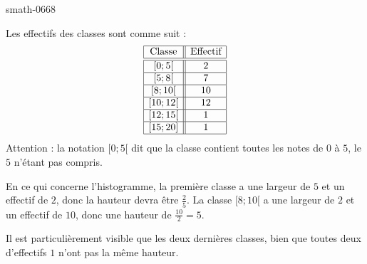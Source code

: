 
\begin{corrige}{smath-0668}

\begin{wrapfigure}{r}{12.cm}
   \vspace{-0.5cm}        %
   \centering
   
\end{wrapfigure}


    Les effectifs des classes sont comme suit :
    \begin{equation*}
        \begin{array}[]{|c||c|}
            \hline
            \text{Classe}&\text{Effectif}\\
            \hline\hline
            \mathopen[ 0 ; 5 [&2\\
            \hline
            \mathopen[ 5 ; 8 [&7\\
            \hline
            \mathopen[ 8; 10 [&10\\
            \hline
            \mathopen[ 10;12 [&12\\
            \hline
            \mathopen[ 12 ; 15 [&1\\
            \hline
            \mathopen[ 15 ; 20 \mathclose]&1\\
            \hline
        \end{array}
    \end{equation*}
    Attention : la notation \( \mathopen[ 0; 5 [\) dit que la classe contient toutes les notes de \( 0\) à \( 5\), le \( 5\) n'étant pas compris.

        En ce qui concerne l'histogramme, la première classe a une largeur de \( 5\) et un effectif de \( 2\), donc la hauteur devra être \( \frac{ 2 }{ 5 }\). La classe \( \mathopen[ 8; 10 [\) a une largeur de \( 2\) et un effectif de \( 10\), donc une hauteur de \( \frac{ 10 }{ 2 }=5\).

            Il est particulièrement visible que les deux dernières classes, bien que toutes deux d'effectifs \( 1\) n'ont pas la même hauteur.


\end{corrige}

